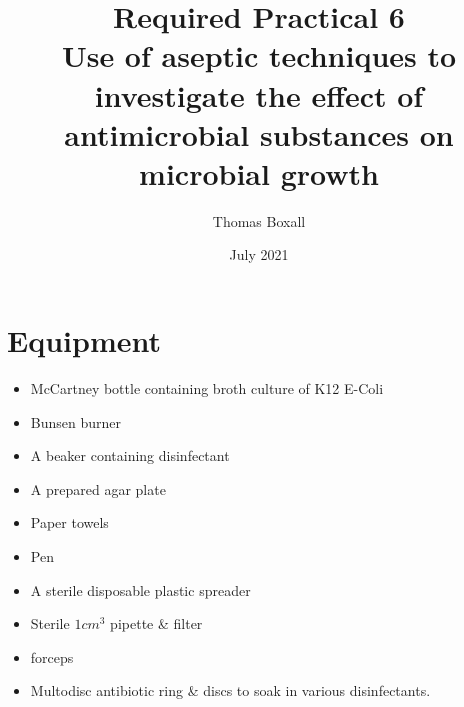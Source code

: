 \documentclass{thomasClass}
\title{\textbf{Required Practical 6}
\\Use of aseptic techniques to investigate the effect of antimicrobial substances on microbial growth
}
\author{Thomas Boxall}
\date{July 2021}
\begin{document}
\maketitle

\section{Equipment}
\begin{itemize}
    \item McCartney bottle containing broth culture of K12 E-Coli
    \item Bunsen burner
    \item A beaker containing disinfectant
    \item A prepared agar plate
    \item Paper towels
    \item Pen
    \item A sterile disposable plastic spreader
    \item Sterile $1cm^3$ pipette \& filter
    \item forceps
    \item Multodisc antibiotic ring \& discs to soak in various disinfectants.
\end{itemize}
\end{document}
